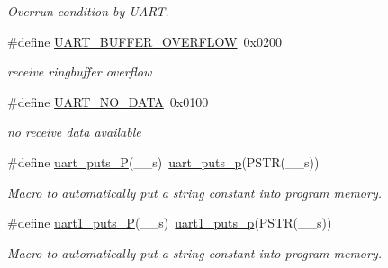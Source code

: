 \begin{DoxyCompactItemize}
\begin{DoxyCompactList}\small\item\em Overrun condition by U\-A\-R\-T. \end{DoxyCompactList}\item 
\hypertarget{group__pfleury__uart_ga94758f3dad6864703b7417d3e40f11df}{\#define \hyperlink{group__pfleury__uart_ga94758f3dad6864703b7417d3e40f11df}{U\-A\-R\-T\-\_\-\-B\-U\-F\-F\-E\-R\-\_\-\-O\-V\-E\-R\-F\-L\-O\-W}~0x0200}\label{group__pfleury__uart_ga94758f3dad6864703b7417d3e40f11df}

\begin{DoxyCompactList}\small\item\em receive ringbuffer overflow \end{DoxyCompactList}\item 
\hypertarget{group__pfleury__uart_ga77ba544d423ff42d400220a05303f268}{\#define \hyperlink{group__pfleury__uart_ga77ba544d423ff42d400220a05303f268}{U\-A\-R\-T\-\_\-\-N\-O\-\_\-\-D\-A\-T\-A}~0x0100}\label{group__pfleury__uart_ga77ba544d423ff42d400220a05303f268}

\begin{DoxyCompactList}\small\item\em no receive data available \end{DoxyCompactList}\item 
\hypertarget{group__pfleury__uart_gae9e143569df2285379bc55f9f5595bf9}{\#define \hyperlink{group__pfleury__uart_gae9e143569df2285379bc55f9f5595bf9}{uart\-\_\-puts\-\_\-\-P}(\-\_\-\-\_\-s)~\hyperlink{group__pfleury__uart_ga6d78b6744db6232f52b4616402036c2f}{uart\-\_\-puts\-\_\-p}(P\-S\-T\-R(\-\_\-\-\_\-s))}\label{group__pfleury__uart_gae9e143569df2285379bc55f9f5595bf9}

\begin{DoxyCompactList}\small\item\em Macro to automatically put a string constant into program memory. \end{DoxyCompactList}\item 
\hypertarget{group__pfleury__uart_gaabd7a5b0c15611ee9ecb2873cc9ee87a}{\#define \hyperlink{group__pfleury__uart_gaabd7a5b0c15611ee9ecb2873cc9ee87a}{uart1\-\_\-puts\-\_\-\-P}(\-\_\-\-\_\-s)~\hyperlink{group__pfleury__uart_ga1e8074d0a2d5922601c5db2f9777ba79}{uart1\-\_\-puts\-\_\-p}(P\-S\-T\-R(\-\_\-\-\_\-s))}\label{group__pfleury__uart_gaabd7a5b0c15611ee9ecb2873cc9ee87a}

\begin{DoxyCompactList}\small\item\em Macro to automatically put a string constant into program memory. \end{DoxyCompactList}\end{DoxyCompactItemize}
